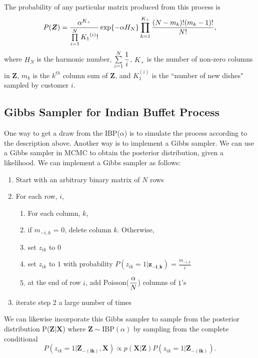 \noindent
The probability of any particular matrix produced from this process is
\begin{equation}
  P(\bm{Z}) = \frac{\alpha^{K_+}}{\prod\limits_{i=1}^{N} {K_1}^{(i)}!} 
              \exp\{-\alpha H_N\}\prod\limits_{k=1}^{K_+}
              \frac{(N-m_k)!(m_k-1)!}{N!},
\end{equation}
where $H_N$ is the harmonic number, $\sum\limits_{i=1}^{N}\displaystyle\frac{1}{i}$, $K_+$ is
the number of non-zero columns in $\bm Z$, $m_k$ is the $k^{th}$ column sum of
$\bm Z$, and $K_1^{(i)}$ is the ``number of new dishes" sampled by customer $i$.\\

\subsection{Gibbs Sampler for Indian Buffet Process}
One way to get a draw from the IBP($\alpha$) is to simulate the process
according to the description above. Another way is to implement a Gibbs
sampler. We can use a Gibbs sampler in MCMC to obtain the posterior
distribution, given a likelihood. We can implement a Gibbs sampler as follows:

\begin{enumerate}
  \item Start with an arbitrary binary matrix of $N$ rows
  \item For each row, $i$,
  \begin{enumerate}
    \item For each column, $k$,
    \item if $m_{-i,k}$ = $0$, delete column $k$. Otherwise,
    \item set $z_{ik}$ to $0$
    \item set $z_{ik}$ to $1$ with probability $P(z_{ik}=1|\bm{z_{-i,k}}) = \frac{m_{-i,k}}{i}$
    \item at the end of row $i$, add Poisson($\displaystyle\frac{\alpha}{N}$) columns of $1$'s
  \end{enumerate}
  \item iterate step 2 a large number of times
\end{enumerate}
We can likewise incorporate this Gibbs sampler to sample from the posterior distribution P($\bm{Z|X}$)
where $\bm Z \sim \text{IBP}(\alpha)$ by sampling from the complete conditional
\begin{equation}
  P(z_{ik}=1|\bm{Z_{-(ik)},X})  \propto p(\bm{X|Z}) P(z_{ik}=1|\bm{Z_{-(ik)}}).
\end{equation}\\


